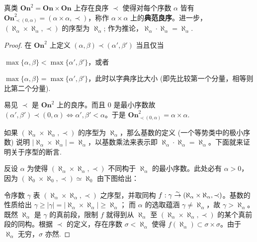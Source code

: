 \begin{theorem}\label{prop:Ord2-canonical}
	真类 $\mathbf{On}^2 = \mathbf{On} \times \mathbf{On}$ 上存在良序 $\prec$ 使得对每个序数 $\alpha$ 皆有 $\mathbf{On}^2_{\prec (0,\alpha)} = (\alpha \times \alpha,\prec)$，称作 $\alpha \times \alpha$ 上的\textbf{典范良序}。进一步，$(\aleph_\alpha \times \aleph_\alpha,\prec)$ 的序型为 $\aleph_\alpha$; 作为推论，$\aleph_\alpha \cdot \aleph_\alpha = \aleph_\alpha$.
\end{theorem}
\begin{proof}
	在 $\mathbf{On}^2$ 上定义 $(\alpha,\beta) \prec (\alpha',\beta')$ 当且仅当
	\begin{compactitem}
		\item $\max\{\alpha,\beta\} < \max\{\alpha',\beta'\}$，或者
		\item $\max\{\alpha,\beta\} = \max\{\alpha',\beta'\}$，此时以字典序比大小 (即先比较第一个分量，相等则比第二个分量).
	\end{compactitem}
	易见 $\prec$ 是 $\mathbf{On}^2$ 上的良序。而且 $0$ 是最小序数故 $(\alpha',\beta') \prec (0,\alpha) \iff \alpha',\beta' < \alpha$。于是 $\mathbf{On}^2_{\prec (0,\alpha)} = \alpha \times \alpha$.
	
	如果 $(\aleph_\alpha \times \aleph_\alpha,\prec)$ 的序型为 $\aleph_\alpha$，那么基数的定义 (一个等势类中的极小序数) 说明 $|\aleph_\alpha \times \aleph_\alpha| = \aleph_\alpha$，以基数乘法来表示即 $\aleph_\alpha \cdot \aleph_\alpha = \aleph_\alpha$。下面就来证明关于序型的断言.

	反设 $\alpha$ 为使得 $(\aleph_\alpha \times \aleph_\alpha,\prec)$ 不同构于 $\aleph_\alpha$ 的最小序数。此处必有 $\alpha > 0$，因为 $(\aleph_0 \times \aleph_0,\prec) \simeq \aleph_0$ 由下图给出：
	\begin{center} \qquad {}\end{center}
	令序数 $\gamma$ 表 $(\aleph_\alpha \times \aleph_\alpha,\prec)$ 之序型，并取同构 $f: \gamma \stackrel{\sim}{\rightarrow} (\aleph_\alpha \times \aleph_\alpha,\prec)$。基数的性质给出 $\gamma \geqslant |\gamma| = |\aleph_\alpha \times \aleph_\alpha| \geqslant \aleph_\alpha$；
	而 $\alpha$ 的选取蕴涵 $\gamma \neq \aleph_\alpha$，故 $\gamma > \aleph_\alpha$。既然 $\aleph_\alpha$ 是 $\gamma$ 的真前段，限制 $f$ 就得到从 $\aleph_\alpha$ 至 $(\aleph_\alpha \times \aleph_\alpha,\prec)$ 的某个真前段的同构。根据 $\prec$ 的定义，存在序数 $\sigma < \aleph_\alpha$ 使得 $f(\aleph_\alpha) \subset \sigma \times \sigma$。由于 $\aleph_\alpha$ 无穷，$\sigma$ 亦然.
	

\end{proof}
